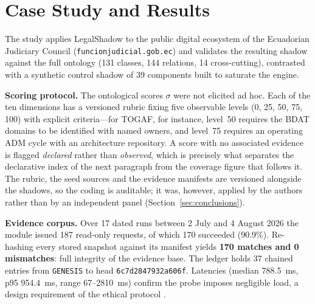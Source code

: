 \documentclass[engproc,proceedingpaper,submit,moreauthors]{Definitions/mdpi}
\begin{document}
\section{Case Study and Results}
\label{sec:results}

The study applies LegalShadow to the public digital ecosystem of the Ecuadorian Judiciary Council (\texttt{funcionjudicial\-.gob\-.ec}) and validates the resulting shadow against the full ontology (131 classes, 144 relations, 14 cross-cutting), contrasted with a synthetic control shadow of 39 components built to saturate the engine.

\textbf{Scoring protocol.} The ontological scores $\sigma$ were not elicited ad hoc. Each of the ten dimensions has a versioned rubric fixing five observable levels (0, 25, 50, 75, 100) with explicit criteria---for TOGAF, for instance, level~50 requires the BDAT domains to be identified with named owners, and level~75 requires an operating ADM cycle with an architecture repository. A score with no associated evidence is flagged \emph{declared} rather than \emph{observed}, which is precisely what separates the declarative index of the next paragraph from the coverage figure that follows it. The rubric, the seed sources and the evidence manifests are versioned alongside the shadows, so the coding is auditable; it was, however, applied by the authors rather than by an independent panel (Section~\ref{sec:conclusions}).

\textbf{Evidence corpus.} Over 17 dated runs between 2 July and 4 August 2026 the module issued 187 read-only requests, of which 170 succeeded (90.9\%). Re-hashing every stored snapshot against its manifest yields \textbf{170 matches and 0 mismatches}: full integrity of the evidence base. The ledger holds 37 chained entries from \texttt{GENESIS} to head \texttt{6c7d2847932a606f}. Latencies (median 788.5~ms, p95 954.4~ms, range 67--2810~ms) confirm the probe imposes negligible load, a design requirement of the ethical protocol \cite{Krotov2020}.
\end{document}

